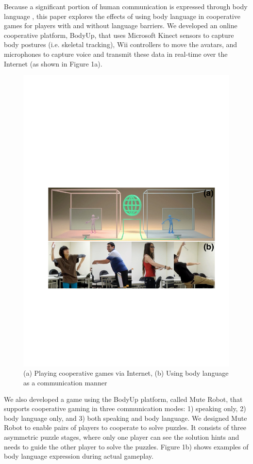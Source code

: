 Because a significant portion of human communication is expressed through body language \cite{7-percent-rule}, this paper explores the effects of using body language in cooperative games for players with and without language barriers. We developed an online cooperative platform, BodyUp, that uses Microsoft Kinect sensors to capture body postures (i.e. skeletal tracking), Wii controllers to move the avatars, and microphones to capture voice and transmit these data in real-time over the Internet (as shown in Figure 1a). 

\begin{figure}[t]
\centering
\includegraphics[width=0.9\columnwidth]{Figures/Topic.pdf}
\caption{(a) Playing cooperative games via Internet, (b) Using body language as a communication manner}
\label{fig:Topic}
\end{figure}

We also developed a game using the BodyUp platform, called Mute Robot, that supports cooperative gaming in three communication modes: 1) speaking only, 2) body language only, and 3) both speaking and body language. We designed Mute Robot to enable pairs of players to cooperate to solve puzzles. It consists of three asymmetric puzzle stages, where only one player can see the solution hints and needs to guide the other player to solve the puzzles. Figure 1b) shows examples of body language expression during actual gameplay.

